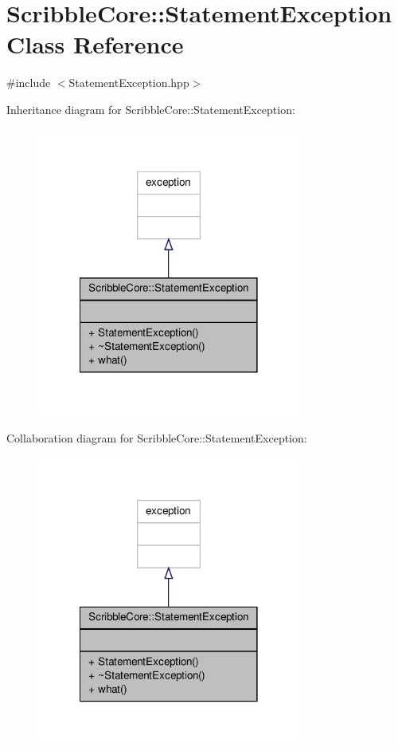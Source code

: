 \hypertarget{class_scribble_core_1_1_statement_exception}{\section{Scribble\-Core\-:\-:Statement\-Exception Class Reference}
\label{class_scribble_core_1_1_statement_exception}
}


{\ttfamily \#include $<$Statement\-Exception.\-hpp$>$}



Inheritance diagram for Scribble\-Core\-:\-:Statement\-Exception\-:
\nopagebreak
\begin{figure}[H]
\begin{center}
\leavevmode
\includegraphics[width=246pt]{class_scribble_core_1_1_statement_exception__inherit__graph}
\end{center}
\end{figure}


Collaboration diagram for Scribble\-Core\-:\-:Statement\-Exception\-:
\nopagebreak
\begin{figure}[H]
\begin{center}
\leavevmode
\includegraphics[width=246pt]{class_scribble_core_1_1_statement_exception__coll__graph}
\end{center}
\end{figure}
